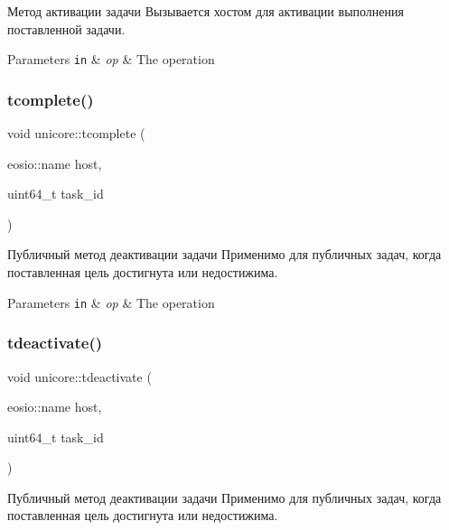 Метод активации задачи Вызывается хостом для активации выполнения поставленной задачи. 


\begin{DoxyParams}[1]{Parameters}
\mbox{\tt in}  & {\em op} & The operation \\
\hline
\end{DoxyParams}
\mbox{\label{classunicore_a54639a2c971d48407747efdda1b2f2ca}} 
\subsubsection{\texorpdfstring{tcomplete()}{tcomplete()}}
{\footnotesize\ttfamily void unicore\+::tcomplete (\begin{DoxyParamCaption}\item[{eosio\+::name}]{host,  }\item[{uint64\+\_\+t}]{task\+\_\+id }\end{DoxyParamCaption})}



Публичный метод деактивации задачи Применимо для публичных задач, когда поставленная цель достигнута или недостижима. 


\begin{DoxyParams}[1]{Parameters}
\mbox{\tt in}  & {\em op} & The operation \\
\hline
\end{DoxyParams}
\mbox{\label{classunicore_a725477908310816ec80cddbf733af04b}} 
\subsubsection{\texorpdfstring{tdeactivate()}{tdeactivate()}}
{\footnotesize\ttfamily void unicore\+::tdeactivate (\begin{DoxyParamCaption}\item[{eosio\+::name}]{host,  }\item[{uint64\+\_\+t}]{task\+\_\+id }\end{DoxyParamCaption})}



Публичный метод деактивации задачи Применимо для публичных задач, когда поставленная цель достигнута или недостижима. 


